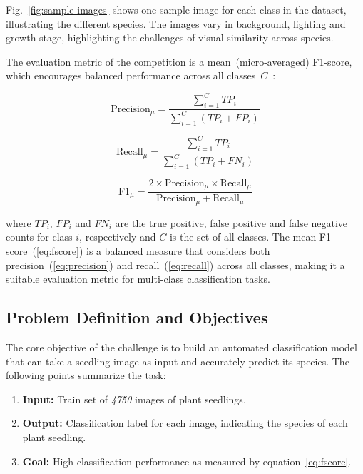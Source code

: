 Fig.~\ref{fig:sample-images} shows one sample image for each class in the dataset, illustrating the different species. The images vary in background, lighting and growth stage, highlighting the challenges of visual similarity across species.

The evaluation metric of the competition is a mean~(micro-averaged) F1-score, which encourages balanced performance across all classes~$C$~\cite{plant-seedlings-classification-evaluation,manning2009introduction,sokolova2009systematic,takahashi2022confidence}:

\begin{equation}
    \text{Precision}_{\mu} = \frac{\sum_{i=1}^{C} \mathit{TP_i}}{\sum_{i=1}^{C} (\mathit{TP_i} + \mathit{FP_i})}\label{eq:precision}
\end{equation}

\begin{equation}
    \text{Recall}_{\mu} = \frac{\sum_{i=1}^{C}  \mathit{TP_i}}{\sum_{i=1}^{C} (\mathit{TP_i} + \mathit{FN_i})}\label{eq:recall}
\end{equation}

\begin{equation}
    \text{F1}_{\mu} = \frac{2 \times \text{Precision}_{\mu} \times \text{Recall}_{\mu}}{\text{Precision}_{\mu} + \text{Recall}_{\mu}}\label{eq:fscore}
\end{equation}

where $TP_i$, $FP_i$ and $FN_i$ are the true positive, false positive and false negative counts for class $i$, respectively and $C$ is the set of all classes. The mean F1-score~(\ref{eq:fscore}) is a balanced measure that considers both precision~(\ref{eq:precision}) and recall~(\ref{eq:recall}) across all classes, making it a suitable evaluation metric for multi-class classification tasks.

\subsection{Problem Definition and Objectives}
The core objective of the challenge is to build an automated classification model that can take a seedling image as input and accurately predict its species. The following points summarize the task:

\begin{enumerate}
    \item \textbf{Input:} Train set of \textit{4750} images of plant seedlings.
    \item \textbf{Output:} Classification label for each image, indicating the species of each plant seedling.
    \item \textbf{Goal:} High classification performance as measured by equation~\ref{eq:fscore}.
\end{enumerate}

